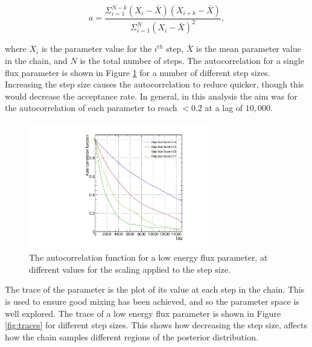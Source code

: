 \begin{equation}
a = \frac{\Sigma^{N-k}_{i=1}(X_i - \bar{X})(X_{i+k} - \bar{X})}{\Sigma^N_{i=1}(X_i-\bar{X})^2},
\end{equation}

where $X_i$ is the parameter value for the $i^{th}$ step, $\bar{X}$ is the mean parameter value in the chain, and $N$ is the total number of steps. The autocorrelation for a single flux parameter is shown in Figure \ref{fig:autocorr} for a number of different step sizes. Increasing the step size causes the autocorrelation to reduce quicker, though this would decrease the acceptance rate. In general, in this analysis the aim was for the autocorrelation of each parameter to reach $<0.2$ at a lag of $10,000$.

\begin{figure}[!htbp]
\centering
\includegraphics*[width=0.7\textwidth,clip]{figs/autoCorr}
\caption{The autocorrelation function for a low energy flux parameter, at different values for the scaling applied to the step size.}\label{fig:autocorr}
\end{figure}

The trace of the parameter is the plot of its value at each step in the chain. This is used to ensure good mixing has been achieved, and so the parameter space is well explored. The trace of a low energy flux parameter is shown in Figure \ref{fig:traces} for different step sizes. This shows how decreasing the step size, affects how the chain samples different regions of the posterior distribution.

